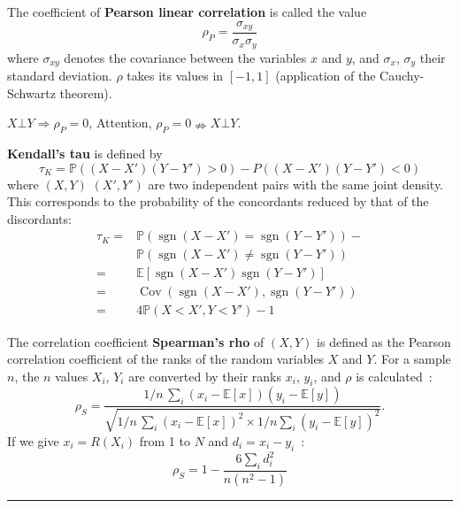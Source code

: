 \begin{f}

The coefficient of \textbf{Pearson linear correlation} is called the value
\[
\rho_P = \frac{\sigma_{xy}}{\sigma_x \sigma_y}
\]
where \(\sigma_{xy}\) denotes the covariance between the variables \(x\) and \(y\), and \(\sigma_x\), \(\sigma_y\) their standard deviation.
\(\rho\) takes its values in \([-1,1]\) (application of the Cauchy-Schwartz theorem).

\(X\bot Y \Rightarrow \rho_P=0\), Attention, \(\rho_P=0 \nRightarrow X\bot Y \). 


 

\textbf{Kendall's tau} is defined by
\[
\tau_K=\mathbb{P}((X-X')(Y-Y')>0)-P((X-X')(Y-Y')<0)
\]
where \((X,Y)\)  \((X',Y')\) are two independent pairs with the same joint density. This corresponds to the probability of the concordants reduced by that of the discordants:
\begin{align*}
\tau_K	=&\mathbb{P}\left(\operatorname{sgn}(X-X')=\operatorname{sgn}(Y-Y')\right)-\\
		&\mathbb{P}\left(\operatorname{sgn}(X-X')\neq \operatorname{sgn}(Y-Y')\right)\\
=&\mathbb{E}\left[ \operatorname{sgn}(X-X')\operatorname{sgn}(Y-Y')\right]\\
=&\operatorname{Cov}(\operatorname{sgn}(X-X'),\operatorname{sgn}(Y-Y'))\\
=&4\mathbb{P}(X<X',Y<Y')-1 
\end{align*}

The correlation coefficient \textbf{Spearman's rho} of \((X,Y)\) is defined as the Pearson correlation coefficient of the ranks of the random variables \(X\) and \(Y\).
For a sample \(n\), the \(n\) values \(X_i\), \(Y_i\) are converted by their ranks \(x_i\), \(y_i\), and \(\rho\) is calculated~:
\[
\rho_S = \frac{1/n\,\sum_i(x_i-\mathbb{E}[x])(y_i-\mathbb{E}[y])}{\sqrt{1/n\,\sum_i (x_i-\mathbb{E}[x])^2 \times 1/n\sum_i(y_i-\mathbb{E}[y])^2}}.
\]
If we give \(x_i= R(X_i)\) from 1 to \(N\) and \(d_i = x_i - y_i\)~:
\[    \rho_S = 1- {\frac {6 \sum_i d_i^2}{n(n^2 - 1)}}\]

\end{f}
\hrule

